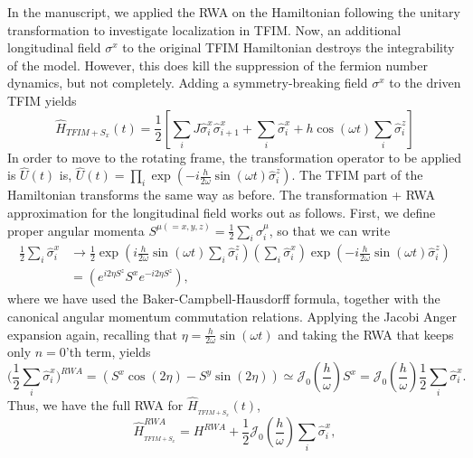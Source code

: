 \documentclass[aps,prb,reprint,showpacs,floatfix,superscriptaddress, onecolumn, nofootinbib, 9pt]{revtex4-2}
\begin{document}
\begin{enumerate}
{In the manuscript, we applied the RWA on the Hamiltonian following the unitary transformation to investigate localization in TFIM. Now, an additional longitudinal field $\sigma^x$ to the original TFIM Hamiltonian destroys the integrability of the model. However, this does kill the suppression of the fermion number dynamics, but not completely.  Adding a symmetry-breaking field $\sigma^x$ to the driven TFIM yields 
\begin{equation}
	\hat{H}_{TFIM+S_x}(t) =\frac{1}{2}\left[\sum_{i} J \hat{\sigma}_{i}^{x} \hat{\sigma}_{i+1}^{x}+\sum_{i} \hat{\sigma}_{i}^{x}+h \cos (\omega t) \sum_{i} \hat{\sigma}_{i}^{z}\right]
\end{equation}
In order to move to the rotating frame, the transformation operator to be applied is $\displaystyle \hat{U}(t)$ is, $\hat{U}(t)=\prod_{i} \exp \left(-i \frac{h}{2 \omega} \sin (\omega t) \hat{\sigma}_{i}^{z}\right)$. The TFIM part of the Hamiltonian transforms the same way as before.	The transformation + RWA approximation for the longitudinal field works out as follows. First, we define proper angular momenta $\displaystyle S^{\mu(=x,y,z)} = \frac12\sum_i \hat{\sigma}^\mu_i$, so that we can write
\begin{align*}
	\frac12 \sum_i \hat{\sigma}^x_i & \rightarrow\frac{1}{2} \exp \left(i \frac{h}{2 \omega} \sin (\omega t) \sum_{i} \hat{\sigma}_{i}^{z}\right)\left(\sum_{i} \hat{\sigma}_{i}^{x}\right) \exp \left(-i \frac{h}{2 \omega} \sin (\omega t) \hat{\sigma}_{i}^{z}\right) \\
	& =\left(e^{i 2 \eta S^{z}} S^{x} e^{-i 2 \eta S^{z}}\right),
\end{align*}
where we have used the Baker-Campbell-Hausdorff formula, together with the canonical angular momentum commutation relations. Applying the Jacobi Anger expansion again, recalling that $\eta=\frac{h}{2 \omega} \sin (\omega t)$ and taking the RWA that keeps only $n=0$'th term, yields
\begin{equation}
	\Big(\frac12 \sum_i \hat{\sigma}^x_i\Big)^{RWA} = \left(S^{x} \cos (2 \eta)-S^{y} \sin (2 \eta)\right) \simeq \mathcal{J}_{0}\left(\frac{h}{\omega}\right) S^{x} = \mathcal{J}_{0}\left(\frac{h}{\omega}\right)\frac12\sum_i\hat{\sigma}^x_i.
\end{equation}
Thus, we have the full RWA for $\hat{H}_{_{TFIM+S_{x}}}(t)$,
\begin{equation}
	\hat{H}_{_{TFIM+S_{x}}}^{R W A}= H^{RWA}+\frac12 \mathcal{J}_{0}\left(\frac{h}{\omega}\right) \sum_i\hat{\sigma}^x_i,
	\label{eq:tfim_sx1}
\end{equation}
}
\end{enumerate}
\end{document}
